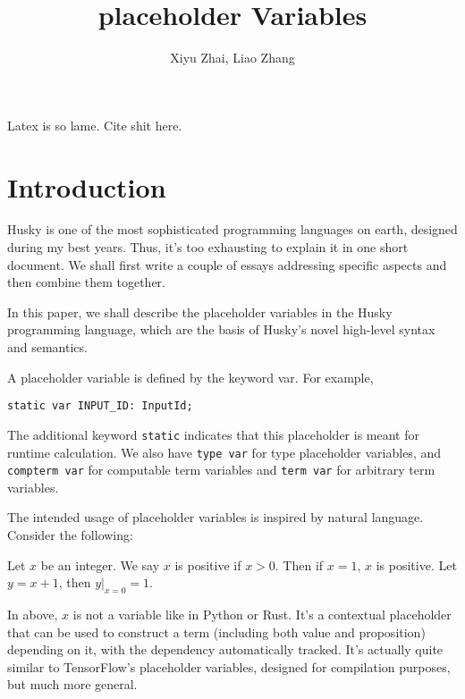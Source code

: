 \documentclass{article}
\title{placeholder Variables}
\author{Xiyu Zhai, Liao Zhang}
\date{}
\newcommand{\huskyinline}[1]{\lstinline[language=Husky]|#1|}
\begin{document}
\maketitle

Latex is so lame. Cite shit \cite{someAuthor2023}here.

\section{Introduction}

Husky is one of the most sophisticated programming languages on earth, designed during my best years. Thus, it's too exhausting to explain it in one short document. We shall first write a couple of essays addressing specific aspects and then combine them together.

In this paper, we shall describe the placeholder variables in the Husky programming language, which are the basis of Husky's novel high-level syntax and semantics.

A placeholder variable is defined by the keyword var. For example,
\begin{tcolorbox}[colback=gray!5,colframe=gray!50!black,title=Husky Code]
    \begin{lstlisting}[language=Husky]
static var INPUT_ID: InputId;
    \end{lstlisting}
\end{tcolorbox}

The additional keyword \huskyinline{static} indicates that this placeholder is meant for runtime calculation.
We also have \huskyinline{type var} for type placeholder variables, and \huskyinline{compterm var} for computable term variables and \huskyinline{term var} for arbitrary term variables.

The intended usage of placeholder variables is inspired by natural language. Consider the following:

\begin{tcolorbox}[colback=gray!5,colframe=gray!50!black,title=Example]
    Let $x$ be an integer. We say $x$ is positive if $x>0$. Then if $x=1$, $x$ is positive. Let $y=x+1$, then $y|_{x=0}=1$.
\end{tcolorbox}

In above, $x$ is not a variable like in Python or Rust. It's a contextual placeholder that can be used to construct a term (including both value and proposition) depending on it, with the dependency automatically tracked. It's actually quite similar to TensorFlow's placeholder variables, designed for compilation purposes, but much more general.
\end{document}

